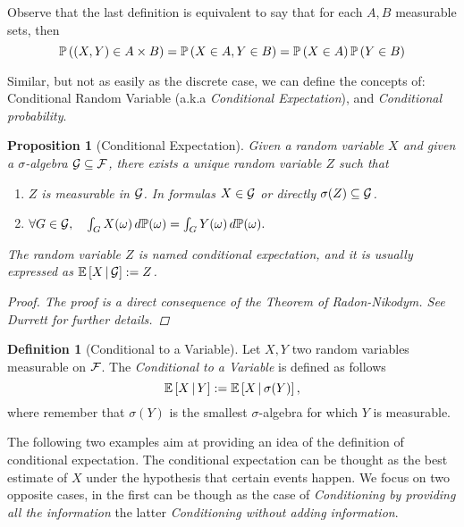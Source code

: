 \documentclass{report}
\newtheorem{prop}{Proposition}
\theoremstyle{definition}
\newtheorem{defn}{Definition}
\begin{document}
Observe that the last definition is equivalent to say that for each $A,B$
measurable sets, then
\begin{equation}
  \mathbb{P}\left( \left( X,Y \right)\in A\times B \right) = \mathbb{P}\left( X\in A, Y\in B\right) = \mathbb{P}\left(X\in A\right)\mathbb{P}\left( Y\in B \right)
\end{equation}

Similar, but not as easily as the discrete case, we can define the concepts
of: Conditional Random Variable (a.k.a \textit{Conditional Expectation}), and
\textit{Conditional probability}.

\begin{prop}[Conditional Expectation]
  Given a random variable $X$ and given a $\sigma$-algebra $\mathcal{G}\subseteq\mathcal{F}$,
  there exists a unique random variable $Z$ such that
  \begin{enumerate}
    \item $Z$ is measurable in $\mathcal{G}$. In formulas $X\in\mathcal{G}$ or directly
      $\sigma(Z)\subseteq \mathcal{G}$.
    \item  \(
        \forall G\in\mathcal{G},\quad \int_G X(\omega)\,d\mathbb{P}(\omega)=\int_G
        Y(\omega)\,d\mathbb{P}(\omega).
          \)
  \end{enumerate}
  The random variable $Z$ is named \textit{conditional expectation}, and it is
  usually expressed as $\mathbb{E}\left[ X\,\vert\,\mathcal{G} \right]:=Z$.
  \begin{proof}
    The proof is a direct consequence of the Theorem of Radon-Nikodym. See
    Durrett for further details.
  \end{proof}
\end{prop}

\begin{defn}[Conditional to a Variable]
  Let $X,Y$ two random variables measurable on $\mathcal{F}$. The
  \textit{Conditional to a Variable} is defined as follows
  \begin{equation}
    \mathbb{E}\left[ X\,\vert\,Y \right]:=\mathbb{E}\left[ X\,\vert\, \sigma(Y) \right],
  \end{equation}
  where remember that $\sigma(Y)$ is the smallest $\sigma$-algebra for which
  $Y$ is measurable.
\end{defn}

The following two examples aim at providing an idea of the definition of
conditional expectation. The conditional expectation can be thought as the
best estimate of $X$ under the hypothesis that certain events happen.
We focus on two opposite cases, in the first can be
though as the case of \textit{Conditioning by providing all the information}
the latter \textit{Conditioning without adding information}.
\end{document}
